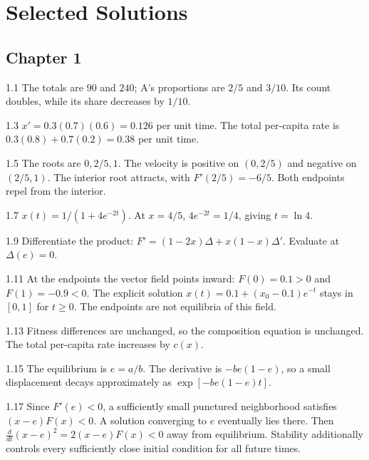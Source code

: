 \documentclass[11pt,oneside,openany]{book}
\theoremstyle{definition}
\theoremstyle{remark}
\newenvironment{answers}{\begin{description}[leftmargin=2.9em,labelwidth=2.5em,labelsep=.4em,itemsep=8pt,font=\normalfont\bfseries]}{\end{description}}
\numberwithin{equation}{chapter}
\begin{document}
\FloatBarrier\backmatter\chapter*{Selected Solutions}
\section*{Chapter 1}
\begin{answers}
\item[1.1] The totals are $90$ and $240$; A's proportions are $2/5$ and $3/10$. Its count doubles, while its share decreases by $1/10$.
\item[1.3] $x'=0.3(0.7)(0.6)=0.126$ per unit time. The total per-capita rate is $0.3(0.8)+0.7(0.2)=0.38$ per unit time.
\item[1.5] The roots are $0,2/5,1$. The velocity is positive on $(0,2/5)$ and negative on $(2/5,1)$. The interior root attracts, with $F'(2/5)=-6/5$. Both endpoints repel from the interior.
\item[1.7] $x(t)=1/(1+4e^{-2t})$. At $x=4/5$, $4e^{-2t}=1/4$, giving $t=\ln4$.
\item[1.9] Differentiate the product: $F'=(1-2x)\Delta+x(1-x)\Delta'$. Evaluate at $\Delta(e)=0$.
\item[1.11] At the endpoints the vector field points inward: $F(0)=0.1>0$ and $F(1)=-0.9<0$. The explicit solution $x(t)=0.1+(x_0-0.1)e^{-t}$ stays in $[0,1]$ for $t\geq0$. The endpoints are not equilibria of this field.
\item[1.13] Fitness differences are unchanged, so the composition equation is unchanged. The total per-capita rate increases by $c(x)$.
\item[1.15] The equilibrium is $e=a/b$. The derivative is $-be(1-e)$, so a small displacement decays approximately as $\exp[-be(1-e)t]$.
\item[1.17] Since $F'(e)<0$, a sufficiently small punctured neighborhood satisfies $(x-e)F(x)<0$. A solution converging to $e$ eventually lies there. Then $\frac{d}{dt}(x-e)^2=2(x-e)F(x)<0$ away from equilibrium. Stability additionally controls every sufficiently close initial condition for all future times.
\end{answers}
\end{document}
